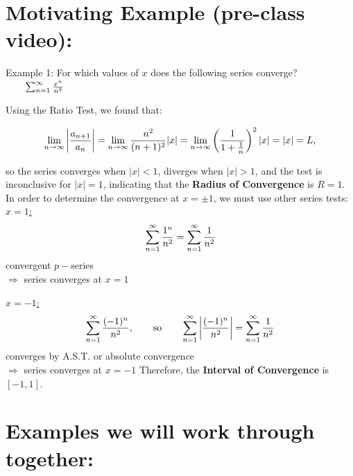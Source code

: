 \vspace*{-.1in}

\section*{Motivating Example (pre-class video):}


\vspace*{-.1in}

Example 1:  For which values of \(x\) does the following series converge?
 \( \qquad \sum_{n=1}^\infty \frac{x^n}{n^2}\)
 
Using the Ratio Test, we found that:


\[
\lim_{n\rightarrow\infty} \left| \frac{a_{n+1}}{a_n} \right| = \lim_{n\rightarrow\infty} \frac{n^2}{(n+1)^2}|x| = \lim_{n\rightarrow\infty} \left( \frac{1}{1+\tfrac{1}{n} }\right)^2 |x| = |x| = L,
\]

so the series converges when \(|x|<1\), diverges when \(|x|>1\), and the test is inconclusive for \(|x|=1\), indicating that the \textbf{Radius of Convergence} is \(R=1\). In order to determine the convergence at \(x=\pm 1\), we must use other series tests:
\vspace*{-.1in}
\underline{\(x=1\):}\\
\[
\sum_{n=1}^\infty \frac{1^n}{n^2} = \sum_{n=1}^\infty \frac{1}{n^2}
\]
convergent \(p-\)series\\
\(\Rightarrow\) series converges at \(x=1\)

\underline{\(x=-1\):}\\
\[
\sum_{n=1}^\infty \frac{(-1)^n}{n^2}, \qquad \text{so} \qquad  \sum_{n=1}^\infty \left|\frac{(-1)^n}{n^2}\right| = \sum_{n=1}^\infty \frac{1}{n^2}
\]
converges by A.S.T. or absolute convergence \\
\(\Rightarrow\) series converges at \(x=-1\)
\vspace*{-.1in}
Therefore,  the \textbf{Interval of Convergence} is \([-1,1]\).

 


 
 \pagebreak



\section*{Examples we will work through together:}



